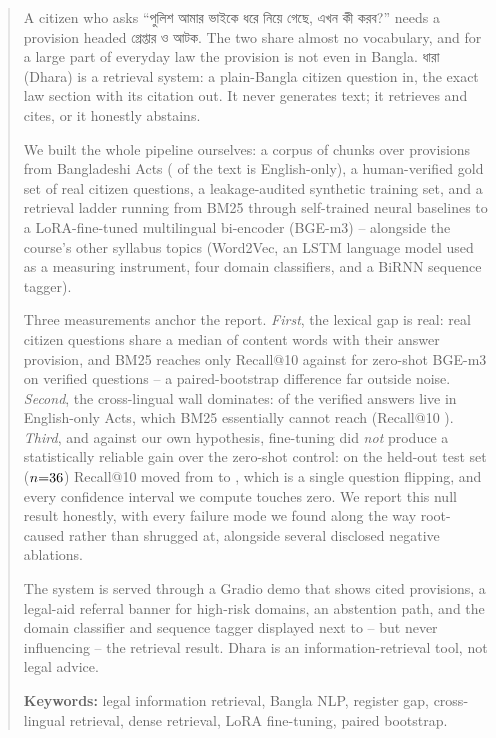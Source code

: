 \documentclass[10pt,a4paper]{article}
\newcommand{\bng}[1]{{\bn #1}}
\begin{document}
\begin{abstract}\noindent
A citizen who asks \bng{``পুলিশ আমার ভাইকে ধরে নিয়ে গেছে, এখন কী করব?''} needs a provision headed \bng{গ্রেপ্তার ও আটক}. The two share almost no vocabulary, and for a large part of everyday law the provision is not even in Bangla. \bng{ধারা} (Dhara) is a retrieval system: a plain-Bangla citizen question in, the exact law section with its citation out. It never generates text; it retrieves and cites, or it honestly abstains.

We built the whole pipeline ourselves: a corpus of \nChunks{} chunks over \nProvisions{} provisions from \nActs{} Bangladeshi Acts (\pctEnChunks{} of the text is English-only), a human-verified gold set of \nGold{} real citizen questions, a leakage-audited synthetic training set, and a retrieval ladder running from BM25 through self-trained neural baselines to a LoRA-fine-tuned multilingual bi-encoder (BGE-m3) -- alongside the course's other syllabus topics (Word2Vec, an LSTM language model used as a measuring instrument, four domain classifiers, and a BiRNN sequence tagger).

Three measurements anchor the report. \emph{First}, the lexical gap is real: real citizen questions share a median of \overlapMedianReal{} content words with their answer provision, and BM25 reaches only \RtenBmLadder{} Recall@10 against \RtenZsLadder{} for zero-shot BGE-m3 on \nProbe{} verified questions -- a paired-bootstrap difference far outside noise. \emph{Second}, the cross-lingual wall dominates: \pctProbeEn{} of the verified answers live in English-only Acts, which BM25 essentially cannot reach (Recall@10 \RtenBmEn). \emph{Third}, and against our own hypothesis, fine-tuning did \emph{not} produce a statistically reliable gain over the zero-shot control: on the held-out test set ($n{=}\nTest$) Recall@10 moved from \RtenZs{} to \RtenFt{}, which is a single question flipping, and every confidence interval we compute touches zero. We report this null result honestly, with every failure mode we found along the way root-caused rather than shrugged at, alongside several disclosed negative ablations.

The system is served through a Gradio demo that shows cited provisions, a legal-aid referral banner for high-risk domains, an abstention path, and the domain classifier and sequence tagger displayed next to -- but never influencing -- the retrieval result. Dhara is an information-retrieval tool, not legal advice.

\medskip
\textbf{Keywords:} legal information retrieval, Bangla NLP, register gap, cross-lingual retrieval, dense retrieval, LoRA fine-tuning, paired bootstrap.
\end{abstract}
\end{document}
